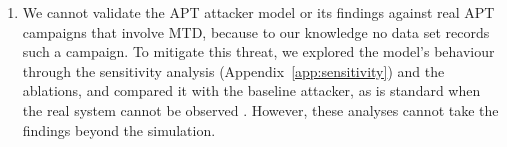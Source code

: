 \documentclass{cshonours}
\begin{document}
\begin{enumerate}[resume*=threats]
\item\label{thr:observation} We cannot validate the APT attacker model or its
findings against real APT campaigns that involve MTD, because to our knowledge
no data set records such a campaign. To mitigate this threat, we explored the
model's behaviour through the sensitivity analysis
(Appendix~\ref{app:sensitivity}) and the ablations, and compared it with the
baseline attacker, as is standard when the real system cannot be observed
\citep{sargent2011}. However, these analyses cannot take the findings beyond
the simulation.
\end{enumerate}
\end{document}
